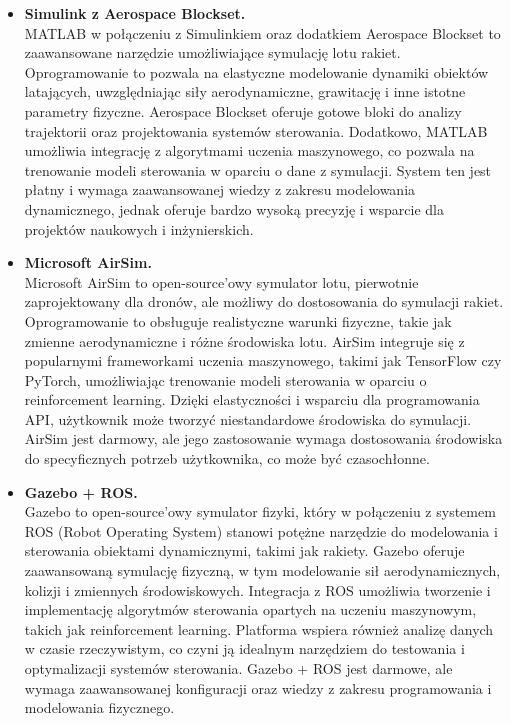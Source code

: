 \begin{itemize}
    \item \textbf{Simulink z Aerospace Blockset.} \\
    MATLAB w połączeniu z Simulinkiem oraz dodatkiem Aerospace Blockset to zaawansowane narzędzie umożliwiające symulację lotu rakiet. Oprogramowanie to pozwala na elastyczne modelowanie dynamiki obiektów latających, uwzględniając siły aerodynamiczne, grawitację i inne istotne parametry fizyczne. Aerospace Blockset oferuje gotowe bloki do analizy trajektorii oraz projektowania systemów sterowania. Dodatkowo, MATLAB umożliwia integrację z algorytmami uczenia maszynowego, co pozwala na trenowanie modeli sterowania w oparciu o dane z symulacji. System ten jest płatny i wymaga zaawansowanej wiedzy z zakresu modelowania dynamicznego, jednak oferuje bardzo wysoką precyzję i wsparcie dla projektów naukowych i inżynierskich.

    \item \textbf{Microsoft AirSim.} \\
    Microsoft AirSim to open-source'owy symulator lotu, pierwotnie zaprojektowany dla dronów, ale możliwy do dostosowania do symulacji rakiet. Oprogramowanie to obsługuje realistyczne warunki fizyczne, takie jak zmienne aerodynamiczne i różne środowiska lotu. AirSim integruje się z popularnymi frameworkami uczenia maszynowego, takimi jak TensorFlow czy PyTorch, umożliwiając trenowanie modeli sterowania w oparciu o reinforcement learning. Dzięki elastyczności i wsparciu dla programowania API, użytkownik może tworzyć niestandardowe środowiska do symulacji. AirSim jest darmowy, ale jego zastosowanie wymaga dostosowania środowiska do specyficznych potrzeb użytkownika, co może być czasochłonne.

    \item \textbf{Gazebo + ROS.} \\
    Gazebo to open-source'owy symulator fizyki, który w połączeniu z systemem ROS (Robot Operating System) stanowi potężne narzędzie do modelowania i sterowania obiektami dynamicznymi, takimi jak rakiety. Gazebo oferuje zaawansowaną symulację fizyczną, w tym modelowanie sił aerodynamicznych, kolizji i zmiennych środowiskowych. Integracja z ROS umożliwia tworzenie i implementację algorytmów sterowania opartych na uczeniu maszynowym, takich jak reinforcement learning. Platforma wspiera również analizę danych w czasie rzeczywistym, co czyni ją idealnym narzędziem do testowania i optymalizacji systemów sterowania. Gazebo + ROS jest darmowe, ale wymaga zaawansowanej konfiguracji oraz wiedzy z zakresu programowania i modelowania fizycznego.
\end{itemize}

